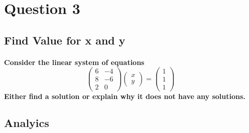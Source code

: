\section{Question 3}
\subsection{Find Value for x and y}
\paragraph{Consider the linear system of equations
    $$ \begin{pmatrix}
            6 & -4 \\
            8 & -6 \\
            2 & 0
        \end{pmatrix} \begin{pmatrix}
            x \\
            y
        \end{pmatrix} = \begin{pmatrix}
            1 \\
            1 \\
            1
        \end{pmatrix} $$
    Either find a solution or explain why it does not have any solutions.
}
\subsection{Analyics}

